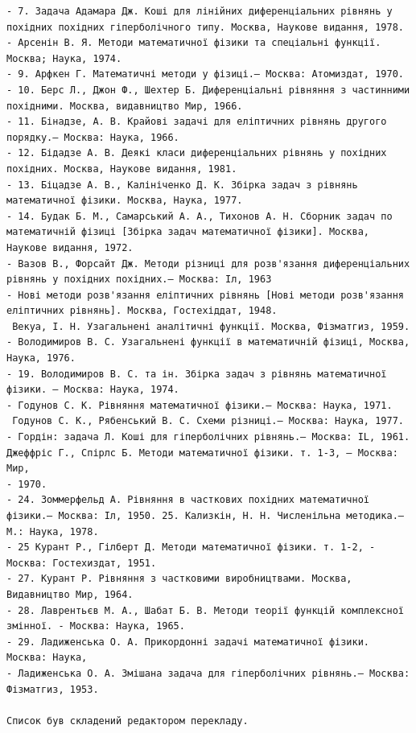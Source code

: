 \documentclass[
  ukrainian,
]{article}
\begin{document}
\begin{verbatim}
- 7. Задача Адамара Дж. Коші для лінійних диференціальних рівнянь у похідних похідних гіперболічного типу. Москва, Наукове видання, 1978.
- Арсенін В. Я. Методи математичної фізики та спеціальні функції. Москва; Наука, 1974.
- 9. Арфкен Г. Математичні методи у фізиці.— Москва: Атомиздат, 1970.
- 10. Берс Л., Джон Ф., Шехтер Б. Диференціальні рівняння з частинними похідними. Москва, видавництво Мир, 1966.
- 11. Бінадзе, А. В. Крайові задачі для еліптичних рівнянь другого порядку.— Москва: Наука, 1966.
- 12. Бідадзе А. В. Деякі класи диференціальних рівнянь у похідних похідних. Москва, Наукове видання, 1981.
- 13. Біцадзе А. В., Калініченко Д. К. Збірка задач з рівнянь математичної фізики. Москва, Наука, 1977.
- 14. Будак Б. М., Самарський А. А., Тихонов А. Н. Сборник задач по математичній фізиці [Збірка задач математичної фізики]. Москва, Наукове видання, 1972.
- Вазов В., Форсайт Дж. Методи різниці для розв'язання диференціальних рівнянь у похідних похідних.— Москва: Іл, 1963
- Нові методи розв'язання еліптичних рівнянь [Нові методи розв'язання еліптичних рівнянь]. Москва, Гостехіддат, 1948.
 Векуа, І. Н. Узагальнені аналітичні функції. Москва, Фізматгиз, 1959.
- Володимиров В. С. Узагальнені функції в математичній фізиці, Москва, Наука, 1976.
- 19. Володимиров В. С. та ін. Збірка задач з рівнянь математичної фізики. — Москва: Наука, 1974.
- Годунов С. К. Рівняння математичної фізики.— Москва: Наука, 1971.
 Годунов С. К., Рябенський В. С. Схеми різниці.— Москва: Наука, 1977.
- Гордін: задача Л. Коші для гіперболічних рівнянь.— Москва: IL, 1961. Джеффріс Г., Спірлс Б. Методи математичної фізики. т. 1-3, — Москва: Мир,
- 1970.
- 24. Зоммерфельд А. Рівняння в часткових похідних математичної фізики.— Москва: Іл, 1950. 25. Кализкін, Н. Н. Численільна методика.— М.: Наука, 1978.
- 25 Курант Р., Гілберт Д. Методи математичної фізики. т. 1-2, - Москва: Гостехиздат, 1951.
- 27. Курант Р. Рівняння з частковими виробництвами. Москва, Видавництво Мир, 1964.
- 28. Лаврентьєв М. А., Шабат Б. В. Методи теорії функцій комплексної змінної. - Москва: Наука, 1965.
- 29. Ладиженська О. А. Прикордонні задачі математичної фізики. Москва: Наука,
- Ладиженська О. А. Змішана задача для гіперболічних рівнянь.— Москва: Фізматгиз, 1953.

Список був складений редактором перекладу.


\end{verbatim}
\end{document}
